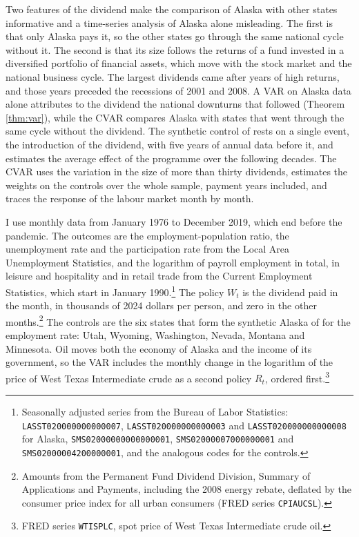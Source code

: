 \documentclass[12pt,a4paper]{article}
\theoremstyle{definition}
\theoremstyle{definition}\newtheorem{example}{Example}
\theoremstyle{definition}\newtheorem{definition}{Definition}
\begin{document}
Two features of the dividend make the comparison of Alaska with other states informative and a time-series analysis of Alaska alone misleading. The first is that only Alaska pays it, so the other states go through the same national cycle without it. The second is that its size follows the returns of a fund invested in a diversified portfolio of financial assets, which move with the stock market and the national business cycle. The largest dividends came after years of high returns, and those years preceded the recessions of 2001 and 2008. A VAR on Alaska data alone attributes to the dividend the national downturns that followed (Theorem \ref{thm:var}), while the CVAR compares Alaska with states that went through the same cycle without the dividend. The synthetic control of \citet{JonesMarinescu2022} rests on a single event, the introduction of the dividend, with five years of annual data before it, and estimates the average effect of the programme over the following decades. The CVAR uses the variation in the size of more than thirty dividends, estimates the weights on the controls over the whole sample, payment years included, and traces the response of the labour market month by month.

I use monthly data from January 1976 to December 2019, which end before the pandemic. The outcomes are the employment-population ratio, the unemployment rate and the participation rate from the Local Area Unemployment Statistics, and the logarithm of payroll employment in total, in leisure and hospitality and in retail trade from the Current Employment Statistics, which start in January 1990.\footnote{Seasonally adjusted series from the Bureau of Labor Statistics: \texttt{LASST020000000000007}, \texttt{LASST020000000000003} and \texttt{LASST020000000000008} for Alaska, \texttt{SMS02000000000000001}, \texttt{SMS02000007000000001} and \texttt{SMS02000004200000001}, and the analogous codes for the controls.} The policy $W_t$ is the dividend paid in the month, in thousands of 2024 dollars per person, and zero in the other months.\footnote{Amounts from the Permanent Fund Dividend Division, Summary of Applications and Payments, including the 2008 energy rebate, deflated by the consumer price index for all urban consumers (FRED series \texttt{CPIAUCSL}).} The controls are the six states that form the synthetic Alaska of \citet{JonesMarinescu2022} for the employment rate: Utah, Wyoming, Washington, Nevada, Montana and Minnesota. Oil moves both the economy of Alaska and the income of its government, so the VAR includes the monthly change in the logarithm of the price of West Texas Intermediate crude as a second policy $R_t$, ordered first.\footnote{FRED series \texttt{WTISPLC}, spot price of West Texas Intermediate crude oil.}
\end{document}
